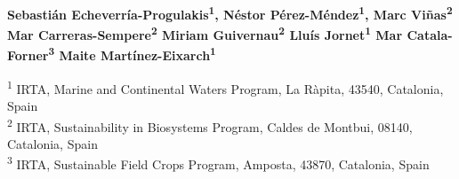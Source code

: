 \begin{center}
\textbf{
Sebastián Echeverría-Progulakis\textsuperscript{1},
Néstor Pérez-Méndez\textsuperscript{1},
Marc Viñas\textsuperscript{2}
Mar Carreras-Sempere\textsuperscript{2}
Miriam Guivernau\textsuperscript{2}
Lluís Jornet\textsuperscript{1}
Mar Catala-Forner\textsuperscript{3}
Maite Martínez-Eixarch\textsuperscript{1}
}
\end{center}

\vspace{1ex}

\begin{center}
\textsuperscript{1} IRTA, Marine and Continental Waters Program, La Ràpita, 43540, Catalonia, Spain \\
\textsuperscript{2} IRTA, Sustainability in Biosystems Program, Caldes de Montbui, 08140, Catalonia, Spain\\
\textsuperscript{3} IRTA, Sustainable Field Crops Program, Amposta, 43870, Catalonia, Spain  \\

\end{center}


%
%
%
%
%
%
%
%
     
